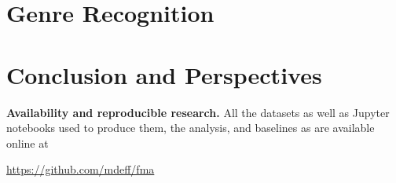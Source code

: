 \documentclass{article}
\begin{document}
\section{Genre Recognition} %
%
%
%





\section{Conclusion and Perspectives}

{\bf Availability and reproducible research.}
All the datasets as well as Jupyter notebooks used to produce them, the
analysis, and baselines as are available online at

\url{https://github.com/mdeff/fma}
\end{document}
